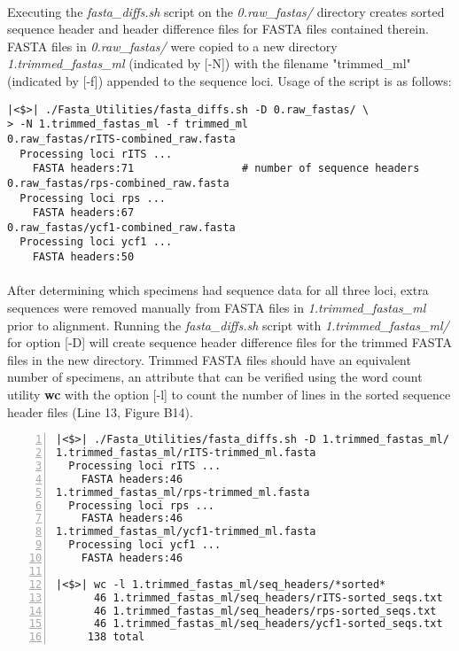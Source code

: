 \clearpage

\paragraph{} Executing the \textit{fasta\_diffs.sh} script on the \textit{0.raw\_fastas/} directory creates sorted sequence header and header difference files for FASTA files contained therein.  FASTA files in \textit{0.raw\_fastas/} were copied to a new directory \textit{1.trimmed\_fastas\_ml} (indicated by [-N]) with the filename "trimmed\_ml" (indicated by [-f]) appended to the sequence loci.  Usage of the script is as follows:

\vspace*{36pt}

\begin{lstlisting}[caption={Execute the program from the main level of the project directory.}]
|<$>| ./Fasta_Utilities/fasta_diffs.sh -D 0.raw_fastas/ \
> -N 1.trimmed_fastas_ml -f trimmed_ml
0.raw_fastas/rITS-combined_raw.fasta
  Processing loci rITS ...
	FASTA headers:71                 # number of sequence headers
0.raw_fastas/rps-combined_raw.fasta
  Processing loci rps ...
	FASTA headers:67
0.raw_fastas/ycf1-combined_raw.fasta
  Processing loci ycf1 ...
	FASTA headers:50
\end{lstlisting}

\vspace*{36pt}

\paragraph{} After determining which specimens had sequence data for all three loci, extra sequences were removed manually from FASTA files in \textit{1.trimmed\_fastas\_ml} prior to alignment.  Running the \textit{fasta\_diffs.sh} script with \textit{1.trimmed\_fastas\_ml/} for option [-D] will create sequence header difference files for the trimmed FASTA files in the new directory.  Trimmed FASTA files should have an equivalent number of specimens, an attribute that can be verified using the word count utility \textbf{wc} with the option [-l] to count the number of lines in the sorted sequence header files (Line 13, Figure B14).

\clearpage

\begin{lstlisting}[numbers=left, caption={Verify equal specimen sampling between loci.}]
|<$>| ./Fasta_Utilities/fasta_diffs.sh -D 1.trimmed_fastas_ml/
1.trimmed_fastas_ml/rITS-trimmed_ml.fasta
  Processing loci rITS ...
	FASTA headers:46
1.trimmed_fastas_ml/rps-trimmed_ml.fasta
  Processing loci rps ...
	FASTA headers:46
1.trimmed_fastas_ml/ycf1-trimmed_ml.fasta
  Processing loci ycf1 ...
	FASTA headers:46
	
|<$>| wc -l 1.trimmed_fastas_ml/seq_headers/*sorted*
      46 1.trimmed_fastas_ml/seq_headers/rITS-sorted_seqs.txt
      46 1.trimmed_fastas_ml/seq_headers/rps-sorted_seqs.txt
      46 1.trimmed_fastas_ml/seq_headers/ycf1-sorted_seqs.txt
     138 total
\end{lstlisting}

